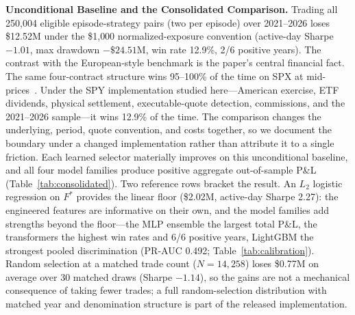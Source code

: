 \documentclass[sigconf,review,anonymous]{acmart}
\begin{document}
\medskip\noindent\textbf{Unconditional Baseline and the Consolidated Comparison.}
Trading all 250{,}004 eligible episode-strategy pairs (two per episode) over 2021--2026 loses \$12.52M under the \$1{,}000 normalized-exposure convention (active-day Sharpe $-1.01$, max drawdown $-\$24.51$M, win rate 12.9\%, 2/6 positive years). The contrast with the European-style benchmark is the paper's central financial fact. The same four-contract structure wins 95--100\% of the time on SPX at mid-prices~\cite{glasserman2025tp2}. Under the SPY implementation studied here---American exercise, ETF dividends, physical settlement, executable-quote detection, commissions, and the 2021--2026 sample---it wins 12.9\% of the time. The comparison changes the underlying, period, quote convention, and costs together, so we document the boundary under a changed implementation rather than attribute it to a single friction. Each learned selector materially improves on this unconditional baseline, and all four model families produce positive aggregate out-of-sample P\&L (Table~\ref{tab:consolidated}). Two reference rows bracket the result. An $L_2$ logistic regression on $F^{\ast}$ provides the linear floor (\$2.02M, active-day Sharpe 2.27): the engineered features are informative on their own, and the model families add strengths beyond the floor---the MLP ensemble the largest total P\&L, the transformers the highest win rates and 6/6 positive years, LightGBM the strongest pooled discrimination (PR-AUC 0.492; Table~\ref{tab:calibration}). Random selection at a matched trade count ($N=14{,}258$) loses \$0.77M on average over 30 matched draws (Sharpe $-1.14$), so the gains are not a mechanical consequence of taking fewer trades; a full random-selection distribution with matched year and denomination structure is part of the released implementation.
\end{document}
